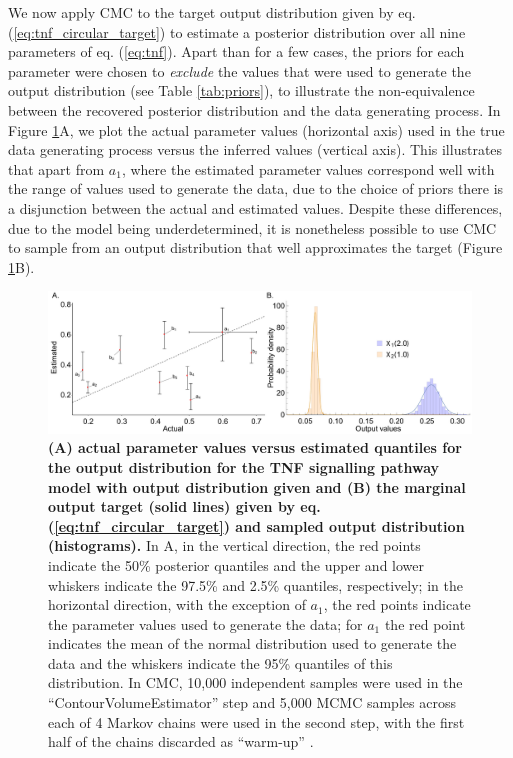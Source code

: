 We now apply CMC to the target output distribution given by eq. (\ref{eq:tnf_circular_target}) to estimate a posterior distribution over all nine parameters of eq. (\ref{eq:tnf}). Apart than for a few cases, the priors for each parameter were chosen to \emph{exclude} the values that were used to generate the output distribution (see Table \ref{tab:priors}), to illustrate the non-equivalence between the recovered posterior distribution and the data generating process. In Figure \ref{fig:tnf_circular_versus}A, we plot the actual parameter values (horizontal axis) used in the true data generating process versus the inferred values (vertical axis). This illustrates that apart from $a_1$, where the estimated parameter values correspond well with the range of values used to generate the data, due to the choice of priors there is a disjunction between the actual and estimated values. Despite these differences, due to the model being underdetermined, it is nonetheless possible to use CMC to sample from an output distribution that well approximates the target (Figure \ref{fig:tnf_circular_versus}B).


\begin{figure}[H]
\centerline{\includegraphics[width=1\textwidth]{../figures/tnf_circular_both.pdf}}
\caption{\textbf{(A) actual parameter values versus estimated quantiles for the output distribution for the TNF signalling pathway model with output distribution given and (B) the marginal output target (solid lines) given by eq. (\ref{eq:tnf_circular_target}) and sampled output distribution (histograms).} In A, in the vertical direction, the red points indicate the 50\% posterior quantiles and the upper and lower whiskers indicate the 97.5\% and 2.5\% quantiles, respectively; in the horizontal direction, with the exception of $a_1$, the red points indicate the parameter values used to generate the data; for $a_1$ the red point indicates the mean of the normal distribution used to generate the data and the whiskers indicate the 95\% quantiles of this distribution. In CMC, 10,000 independent samples were used in the ``ContourVolumeEstimator'' step and 5,000 MCMC samples across each of 4 Markov chains were used in the second step, with the first half of the chains discarded as ``warm-up'' \cite{lambert2018Student}.}
	\label{fig:tnf_circular_versus}
\end{figure}

